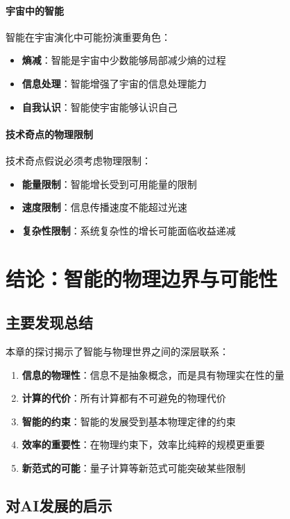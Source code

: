 \paragraph{宇宙中的智能}
智能在宇宙演化中可能扮演重要角色：
\begin{itemize}
\item \textbf{熵减}：智能是宇宙中少数能够局部减少熵的过程
\item \textbf{信息处理}：智能增强了宇宙的信息处理能力
\item \textbf{自我认识}：智能使宇宙能够认识自己
\end{itemize}

\paragraph{技术奇点的物理限制}
技术奇点假说必须考虑物理限制：
\begin{itemize}
\item \textbf{能量限制}：智能增长受到可用能量的限制
\item \textbf{速度限制}：信息传播速度不能超过光速
\item \textbf{复杂性限制}：系统复杂性的增长可能面临收益递减
\end{itemize}

\section{结论：智能的物理边界与可能性}

\subsection{主要发现总结}

本章的探讨揭示了智能与物理世界之间的深层联系：

\begin{enumerate}
\item \textbf{信息的物理性}：信息不是抽象概念，而是具有物理实在性的量
\item \textbf{计算的代价}：所有计算都有不可避免的物理代价
\item \textbf{智能的约束}：智能的发展受到基本物理定律的约束
\item \textbf{效率的重要性}：在物理约束下，效率比纯粹的规模更重要
\item \textbf{新范式的可能}：量子计算等新范式可能突破某些限制
\end{enumerate}

\subsection{对AI发展的启示}

